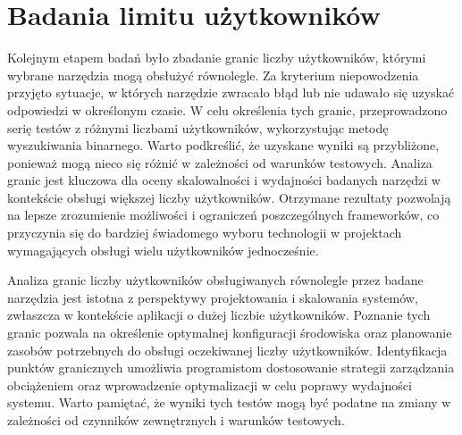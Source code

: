 \section{Badania limitu użytkowników}

Kolejnym etapem badań było zbadanie granic liczby użytkowników, którymi wybrane narzędzia mogą obsłużyć równolegle.
Za kryterium niepowodzenia przyjęto sytuacje, w których narzędzie zwracało błąd lub nie udawało się uzyskać odpowiedzi w określonym czasie.
W celu określenia tych granic, przeprowadzono serię testów z różnymi liczbami użytkowników, wykorzystując metodę wyszukiwania binarnego.
Warto podkreślić, że uzyskane wyniki są przybliżone, ponieważ mogą nieco się różnić w zależności od warunków testowych.
Analiza granic jest kluczowa dla oceny skalowalności i wydajności badanych narzędzi w kontekście obsługi większej liczby użytkowników.
Otrzymane rezultaty pozwolają na lepsze zrozumienie możliwości i ograniczeń poszczególnych frameworków, co przyczynia się do bardziej świadomego wyboru technologii w projektach wymagających obsługi wielu użytkowników jednocześnie.

Analiza granic liczby użytkowników obsługiwanych równolegle przez badane narzędzia jest istotna z perspektywy projektowania i skalowania systemów, zwłaszcza w kontekście aplikacji o dużej liczbie użytkowników.
Poznanie tych granic pozwala na określenie optymalnej konfiguracji środowiska oraz planowanie zasobów potrzebnych do obsługi oczekiwanej liczby użytkowników.
Identyfikacja punktów granicznych umożliwia programistom dostosowanie strategii zarządzania obciążeniem oraz wprowadzenie optymalizacji w celu poprawy wydajności systemu.
Warto pamiętać, że wyniki tych testów mogą być podatne na zmiany w zależności od czynników zewnętrznych i warunków testowych.